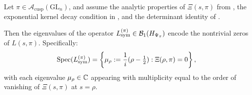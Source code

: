 \begin{theorem}
\label{thm:zero_encoding_general}
Let \( \pi \in \mathcal{A}_{\mathrm{cusp}}(\mathrm{GL}_n) \), and assume the analytic properties of \( \Xi(s, \pi) \) from , the exponential kernel decay condition in , and the determinant identity of .

Then the eigenvalues of the operator \( L_{\mathrm{sym}}^{(\pi)} \in \mathcal{B}_1(H_{\Psi_{\pi}}) \) encode the nontrivial zeros of \( L(s, \pi) \). Specifically:
\[
\operatorname{Spec}(L_{\mathrm{sym}}^{(\pi)}) = \left\{ \mu_\rho := \frac{1}{i}(\rho - \tfrac{1}{2}) : \Xi(\rho, \pi) = 0 \right\},
\]
with each eigenvalue \( \mu_\rho \in \mathbb{C} \) appearing with multiplicity equal to the order of vanishing of \( \Xi(s, \pi) \) at \( s = \rho \).
\end{theorem}
